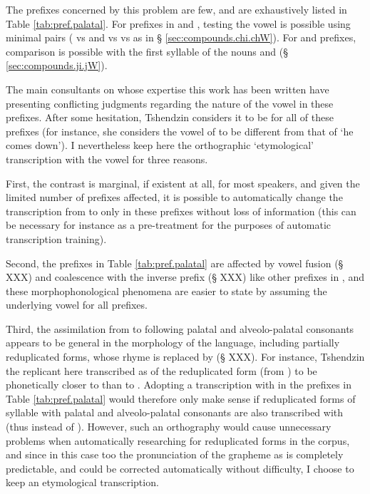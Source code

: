 The prefixes concerned by this problem are few, and are exhaustively listed in Table \ref{tab:pref.palatal}. For prefixes in  and , testing the vowel is possible using minimal pairs ( vs  and  vs vs  as in § \ref{sec:compounds.chi.chW}). For  and  prefixes, comparison is possible with the first syllable of the nouns  and  (§ \ref{sec:compounds.ji.jW}). 

The main consultants on whose expertise this work has been written have presenting conflicting judgments regarding the nature of the vowel in these prefixes. After some hesitation, Tshendzin considers it to be  for all of these prefixes (for instance, she considers the vowel of  to be different from that of  `he comes down'). I nevertheless keep here the orthographic `etymological' transcription with the vowel  for three reasons.

First, the contrast is marginal, if existent at all, for most speakers, and given the limited number of prefixes affected, it is possible to automatically change the transcription from  to  only in these prefixes without loss of information (this can be necessary for instance as a pre-treatment for the purposes of automatic transcription training). 

Second, the prefixes in Table \ref{tab:pref.palatal} are affected by vowel fusion (§ XXX) and coalescence with the inverse prefix  (§ XXX) like other prefixes in , and these morphophonological phenomena are easier to state by assuming the underlying vowel  for all prefixes. 

Third, the assimilation from  to  following palatal and alveolo-palatal consonants appears to be general in the morphology of the language, including partially reduplicated forms, whose rhyme is replaced by  (§ XXX). For instance, Tshendzin the replicant here transcribed as  of the reduplicated form  (from ) to be phonetically closer to  than to . Adopting a transcription with  in the prefixes in Table \ref{tab:pref.palatal} would therefore only make sense if reduplicated forms of syllable with palatal and alveolo-palatal consonants are also transcribed with  (thus  instead of ). However, such an orthography would cause unnecessary problems when automatically researching for reduplicated forms in the corpus, and since in this case too the pronunciation of the grapheme  as  is completely predictable, and could be corrected automatically without difficulty, I choose to keep an etymological transcription. 

